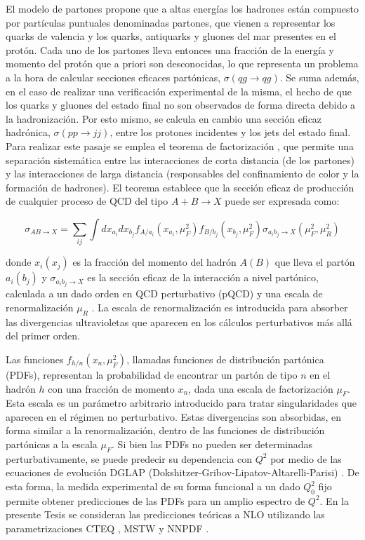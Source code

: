 El modelo de partones propone que a altas energías los hadrones están compuesto por partículas puntuales denominadas partones, que vienen a representar los quarks de valencia y los quarks, antiquarks y gluones del mar presentes en el protón. Cada uno de los partones lleva entonces una fracción de la energía y momento del protón que a priori son desconocidas, lo que representa un problema a la hora de calcular secciones eficaces partónicas, $\sigma(qg\to qg)$.
Se suma además, en el caso de realizar una verificación experimental de la misma, el hecho de que los quarks y gluones del estado final no son observados de forma directa debido a la hadronización. Por esto mismo, se calcula en cambio una sección eficaz hadrónica, $\sigma(pp\to jj)$, entre los protones incidentes y los jets del estado final. Para realizar este pasaje se emplea el teorema de factorización \cite{ELLIS1978281}, que permite una separación sistemática
entre las interacciones de corta distancia (de los partones) y las interacciones de larga distancia (responsables del confinamiento de color y la formación de hadrones). El teorema establece que la sección eficaz de producción de cualquier proceso de QCD del tipo $A+B\to X$ puede ser expresada como:


\begin{equation}
	\sigma_{AB\to X} = \sum_{ij} \int dx_{a_i} dx_{b_j} f_{A/a_i}(x_{a_i}, \mu_{F}^2) f_{B/b_j}(x_{b_j}, \mu_{F}^2) \sigma_{a_i b_j \to X}(\mu_{F}^2, \mu_{R}^2)
	\label{eq:xs_fact}
\end{equation}

\noindent
donde $x_i(x_j)$ es la fracción del momento del hadrón $A(B)$ que lleva el partón $a_i(b_j)$ y $\sigma_{a_i b_j \to X}$ es la sección eficaz de la interacción a nivel partónico, calculada a un dado orden en QCD perturbativo (pQCD) y una escala de renormalización $\mu_R$ \cite{tesis_martin}. La escala de renormalización es introducida
para absorber las divergencias ultravioletas que aparecen en los cálculos perturbativos más
allá del primer orden.

Las funciones $f_{h/n}(x_{n}, \mu_{F}^2)$, llamadas funciones de distribución partónica (PDFs), representan la probabilidad de encontrar un partón de tipo $n$ en el hadrón $h$ con una fracción de
momento $x_n$, dada una escala de factorización $\mu_{F}$. Esta escala es un parámetro arbitrario
introducido para tratar singularidades que aparecen en el régimen no perturbativo. Estas
divergencias son absorbidas, en forma similar a la renormalización, dentro de las funciones
de distribución partónicas a la escala $\mu_F$. Si bien las PDFs no pueden ser determinadas
perturbativamente, se puede predecir su dependencia con $Q^2$ por medio de las ecuaciones
de evolución DGLAP (Dokshitzer-Gribov-Lipatov-Altarelli-Parisi) \cite{di_scattering,lipatov_parton,altarelli-parisi}. De esta forma, la
medida experimental de su forma funcional a un dado $Q^2_0$ fijo permite obtener predicciones
de las PDFs para un amplio espectro de $Q^2$. En la presente Tesis se consideran las predicciones teóricas a NLO utilizando las parametrizaciones CTEQ \cite{cteq}, MSTW \cite{mstw1, mstw2, mstw3} y NNPDF \cite{nnpdf}.

